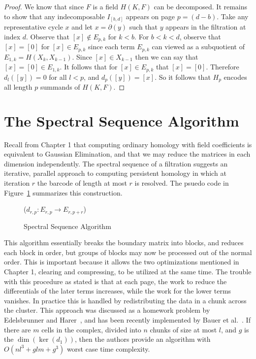 \begin{proof}
We know that since $F$ is a field $H(K,F)$ can be decomposed. It remains to show that any indecomposable $I_{[b,d]}$ appears on page $p = (d-b)$. Take any representative cycle $x$ and let $x = \partial(y)$ such that $y$ appears in the filtration at index $d$. Observe that $[x] \notin E_{p,k}$ for $k < b$. For $b < k < d$, observe that $[x]  = [0]$ for $[x] \in E_{p,k}$  since each term $E_{p,k}$ can viewed as a subquotient of $E_{1,k} = H(X_k, X_{k-1})$. Since $[x] \in X_{k-1}$ then we can say that $[x] = [0] \in E_{1,k} $. It follows that for $[x] \in E_{p,k}$ that $[x] = [0]$. Therefore $d_l([y]) = 0$ for all $l < p$, and $d_p([y])=[x]$. So it follows that $H_p$ encodes all length $p$ summands of $H(K,F)$.
\end{proof}
\section{The Spectral Sequence Algorithm}
\label{sec:persistence-algorithm}
Recall from Chapter 1 that computing ordinary homology with field coefficients is equivalent to Gaussian Elimination, and that we may reduce the matrices in each dimension independently. The spectral sequence of a filtration suggests an iterative, parallel approach to computing persistent homology in which at iteration $r$ the barcode of length at most $r$ is resolved. The  psuedo code in Figure~\ref{alg:ss-alg} summarizes this construction.
\begin{figure}
\begin{codebox}
\li {}  
\li \Do
\li {} 
\li \Do
\li  {}($d_{r,p} : E_{r,p} \rightarrow E_{r,p+r}$)
\End
\End
\end{codebox}
\caption{Spectral Sequence Algorithm}
\label{alg:ss-alg}
\end{figure}
This algorithm essentially breaks the boundary matrix into blocks, and reduces each block in order, but groups of blocks may now be processed out of the normal order. This is important
because it allows the two optimizations mentioned in Chapter 1, clearing and compressing, to be utilized at the same time. The trouble with this procedure as stated is that at each page, the work to reduce the differentials of the later terms increases, while the work for the lower terms vanishes. In practice this is handled by redistributing the data in a chunk across the cluster.  This approach was discussed as a homework problem by Edelsbrunner and Harer~\cite{edelsbrunner2010computational}, and has been recently implemented by Bauer et al.~\cite{bkr-cccph-13}. If there are $m$ cells in the complex, divided into $n$ chunks of size at most $l$, and $g$ is the $\dim(\ker(d_1))$, then the authors provide an algorithm with  $O(nl^3 + glm + g^3)$ worst case time complexity. 

